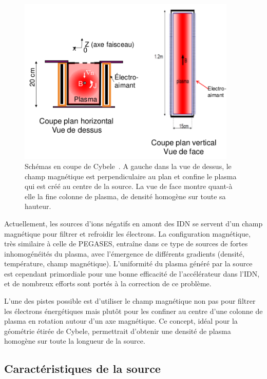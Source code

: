 \begin{refsection}
\begin{figure}[!htbp]
  \centering
    \includegraphics[height=8cm]{figures/4-cybeleSchema.png}
    \caption{Schémas en coupe de Cybele~\parencite{SimoninHDR}. A gauche dans la
vue de dessus, le champ magnétique est perpendiculaire au plan et confine le
plasma qui est créé au centre de la source. La vue de face montre quant-à elle
la fine colonne de plasma, de densité homogène sur toute sa hauteur.
\label{4-cybeleSchema}}
\end{figure}	

Actuellement, les sources d'ions négatifs en amont des IDN se servent d'un champ
magnétique pour filtrer et refroidir les électrons. La configuration magnétique,
très similaire à celle de PEGASES, entraîne dans ce type de sources de fortes
inhomogénéités du plasma, avec l'émergence de différents gradients
(densité, température, champ magnétique). L'uniformité du plasma généré par
la source est cependant primordiale pour une bonne efficacité de l'accélérateur
dans l'IDN, et de nombreux efforts sont portés à la correction de ce problème.

L'une des pistes possible est d'utiliser le champ magnétique non pas pour
filtrer les électrons énergétiques mais plutôt pour les confiner au centre
d'une colonne de plasma en rotation autour d'un axe magnétique. Ce concept,
idéal pour la géométrie étirée de Cybele, permettrait d'obtenir une densité de
plasma homogène sur toute la longueur de la source. 

\subsection{Caractéristiques de la source}


\end{refsection}
